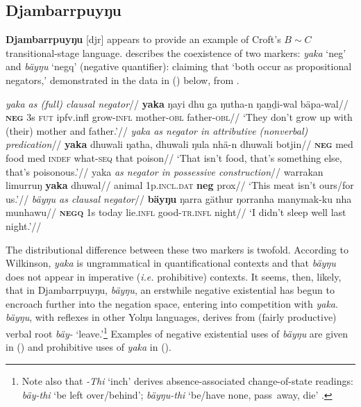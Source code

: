 \documentclass[usenames,dvipsnames,11pt]{article}
\begin{document}
{{\subsection{Djambarrpuyŋu} \textbf{Djambarrpuyŋu} [\gls{djr}] appears to provide an example of Croft's $B\sim C$ transitional-stage language. \citet[356]{Wilkinson1991} describes the coexistence of two markers: \textit{yaka} `\gls{neg}' and \textit{bäyŋu} `\gls{negq}' (negative quantifier): claiming that `both occur as propositional negators,' demonstrated in the data in (\nextx) below, from \citet{Wilkinson1991}.

\pex
\a\begingl\glpreamble \textit{{\em yaka} as (full) clausal negator}//
\gla \textbf{yaka} ŋayi dhu ga ŋutha-n ŋaṉḏi-wal bäpa-wal//
\glb \textsc{\textbf{neg}} 3\gls{s} \textsc{fut} \gls{ipfv}.\gls{infl} grow-\textsc{infl} mother\textsc{-obl} father\textsc{-obl}//
\glft `They don't grow up with (their) mother and father.'//
\endgl
\a\begingl\glpreamble \textit{{\em yaka} as negator in attributive (nonverbal) predication}//
\gla \textbf{yaka} dhuwali ŋatha, dhuwali ŋula nhä-n dhuwali botjin//
\glb \textsc{\textbf{neg}} \gls{med} food \gls{med} \textsc{indef} what-\textsc{seq} that poison//
\glft`That isn't food, that's something else, that's poisonous.'//\endgl
\a\begingl\glpreamble yaka \textit{as negator in possessive construction}//
\gla warrakan limurruŋ \textbf{yaka} dhuwal//
\glb animal 1\gls{p}.\textsc{incl.dat} \textbf{\gls{neg}} \gls{prox}//
\glft`This meat isn't ours/for us.'//
\endgl
\a\begingl
\glpreamble\textit{ {\em bäyŋu} as clausal negator}//
\gla \textbf{bäyŋu} ŋarra gäthur ŋorranha manymak-ku	nha munhawu//
\glb \textsc{\textbf{negq}} 1\gls{s} today lie\textsc{.infl} good-\textsc{tr.infl} night//
\glft `I didn't sleep well last night.'\hfill\citep[357]{Wilkinson1991}//
\endgl\xe

The distributional difference between these two markers is twofold. According to Wilkinson, \textit{yaka} is ungrammatical in quantificational contexts and that \textit{bäyŋu} does not appear in imperative (\textit{i.e.} prohibitive) contexts. It seems, then, likely, that in Djambarrpuyŋu, \textit{bäyŋu}, an erstwhile negative existential has begun to encroach further into the negation space, entering into competition with \textit{yaka}. \textit{bäyŋu}, with reflexes in other Yolŋu languages, derives from (fairly productive) verbal root \textit{bäy-} `leave.'\footnote{Note also that \textit{-Thi} `\gls{inch}' derives absence-associated change-of-state readings: \textit{bäy-thi} `be left over/behind'; \textit{bäyŋu-thi} `be/have none, pass~away, die' \citep[378]{Wilkinson1991}.} Examples of negative existential uses of \textit{bäyŋu} are given in (\nextx) and prohibitive uses of \textit{yaka} in (\anextx).


}}
\end{document}
